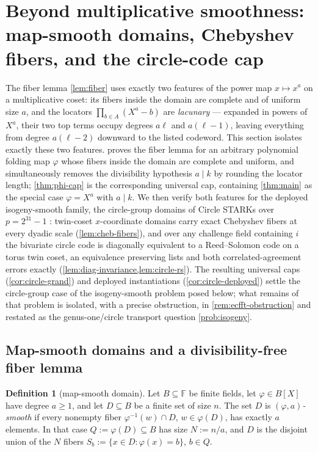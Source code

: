 \documentclass[11pt]{article}
\theoremstyle{definition}
\newtheorem{definition}[definition]{Definition}
\theoremstyle{remark}
\newcommand{\F}{\mathbb{F}}
\newcommand{\B}{B}
\begin{document}
\section{Beyond multiplicative smoothness: map-smooth domains, Chebyshev fibers, and the circle-code cap}\label{sec:isogeny}

The fiber lemma \cref{lem:fiber} uses exactly two features of the power map $x\mapsto x^a$ on a multiplicative coset: its fibers inside the domain are complete and of uniform size $a$, and the locators $\prod_{b\in A}(X^a-b)$ are \emph{lacunary} --- expanded in powers of $X^a$, their two top terms occupy degrees $a\ell$ and $a(\ell-1)$, leaving everything from degree $a(\ell-2)$ downward to the listed codeword. This section isolates exactly these two features.  proves the fiber lemma for an arbitrary polynomial folding map $\varphi$ whose fibers inside the domain are complete and uniform, and simultaneously removes the divisibility hypothesis $a\mid k$ by rounding the locator length; \cref{thm:phi-cap} is the corresponding universal cap, containing \cref{thm:main} as the special case $\varphi=X^a$ with $a\mid k$. We then verify both features for the deployed isogeny-smooth family, the circle-group domains of Circle STARKs over $p=2^{31}-1$ \cite{HLP24}: twin-coset $x$-coordinate domains carry exact Chebyshev fibers at every dyadic scale (\cref{lem:cheb-fibers}), and over any challenge field containing $i$ the bivariate circle code is diagonally equivalent to a Reed--Solomon code on a torus twin coset, an equivalence preserving lists and both correlated-agreement errors exactly (\cref{lem:diag-invariance,lem:circle-rs}). The resulting universal caps (\cref{cor:circle-grand}) and deployed instantiations (\cref{cor:circle-deployed}) settle the circle-group case of the isogeny-smooth problem posed below; what remains of that problem is isolated, with a precise obstruction, in \cref{rem:ecfft-obstruction} and restated as the genus-one/circle transport question \cref{prob:isogeny}.

\subsection{Map-smooth domains and a divisibility-free fiber lemma}
\label{sec:map-smooth}

\begin{definition}[map-smooth domain]\label{def:map-smooth}
Let $\B\subseteq\F$ be finite fields, let $\varphi\in\B[X]$ have degree $a\ge1$, and let $D\subseteq\B$ be a finite set of size $n$. The set $D$ is \emph{$(\varphi,a)$-smooth} if every nonempty fiber $\varphi^{-1}(w)\cap D$, $w\in\varphi(D)$, has exactly $a$ elements. In that case $Q:=\varphi(D)\subseteq\B$ has size $N:=n/a$, and $D$ is the disjoint union of the $N$ fibers $S_b:=\{x\in D:\varphi(x)=b\}$, $b\in Q$.
\end{definition}
\end{document}
